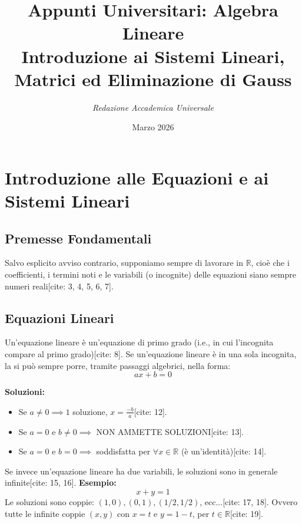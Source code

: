 \documentclass[11pt,a4paper]{article}
\begin{document}
\title{\vspace{-2cm}\textbf{\color{paletteIndigo}Appunti Universitari: Algebra Lineare}\\ \Large Introduzione ai Sistemi Lineari, Matrici ed Eliminazione di Gauss}
\author{\textit{Redazione Accademica Universale}}
\date{Marzo 2026}
\maketitle

\section{Introduzione alle Equazioni e ai Sistemi Lineari}

\subsection{Premesse Fondamentali}
Salvo esplicito avviso contrario, supponiamo sempre di lavorare in $\mathbb{R}$, cioè che i coefficienti, i termini noti e le variabili (o incognite) delle equazioni siano sempre numeri reali[cite: 3, 4, 5, 6, 7].

\subsection{Equazioni Lineari}
\begin{definition}
Un'equazione lineare è un'equazione di primo grado (i.e., in cui l'incognita compare al primo grado)[cite: 8]. Se un'equazione lineare è in una sola incognita, la si può sempre porre, tramite passaggi algebrici, nella forma:
\begin{equation}
ax + b = 0
\end{equation}
\end{definition}

\textbf{Soluzioni:}
\begin{itemize}
    \item Se $a \neq 0 \implies 1$ soluzione, $x = \frac{-b}{a}$[cite: 12].
    \item Se $a = 0$ e $b \neq 0 \implies$ NON AMMETTE SOLUZIONI[cite: 13].
    \item Se $a = 0$ e $b = 0 \implies$ soddisfatta per $\forall x \in \mathbb{R}$ (è un'identità)[cite: 14].
\end{itemize}

\begin{concept}
Se invece un'equazione lineare ha due variabili, le soluzioni sono in generale infinite[cite: 15, 16]. 
\textbf{Esempio:}
\begin{equation}
x + y = 1
\end{equation}
Le soluzioni sono coppie: $(1,0), (0,1), (1/2, 1/2)$, ecc...[cite: 17, 18].
Ovvero tutte le infinite coppie $(x,y)$ con $x = t$ e $y = 1 - t$, per $t \in \mathbb{R}$[cite: 19].
\end{concept}
\end{document}
